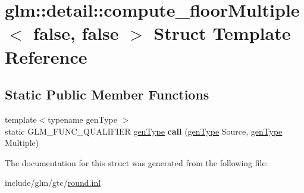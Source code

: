 \hypertarget{structglm_1_1detail_1_1compute__floorMultiple_3_01false_00_01false_01_4}{}\section{glm\+:\+:detail\+:\+:compute\+\_\+floor\+Multiple$<$ false, false $>$ Struct Template Reference}
\label{structglm_1_1detail_1_1compute__floorMultiple_3_01false_00_01false_01_4}
\subsection*{Static Public Member Functions}
\begin{DoxyCompactItemize}
\item 
\mbox{\label{structglm_1_1detail_1_1compute__floorMultiple_3_01false_00_01false_01_4_a795b0efa8ebff0dcbbc055cdccd2156c}} 
{\footnotesize template$<$typename gen\+Type $>$ }\\static G\+L\+M\+\_\+\+F\+U\+N\+C\+\_\+\+Q\+U\+A\+L\+I\+F\+I\+ER \hyperlink{structglm_1_1detail_1_1genType}{gen\+Type} {\bfseries call} (\hyperlink{structglm_1_1detail_1_1genType}{gen\+Type} Source, \hyperlink{structglm_1_1detail_1_1genType}{gen\+Type} Multiple)
\end{DoxyCompactItemize}


The documentation for this struct was generated from the following file\+:\begin{DoxyCompactItemize}
\item 
include/glm/gtc/\hyperlink{round_8inl}{round.\+inl}\end{DoxyCompactItemize}
